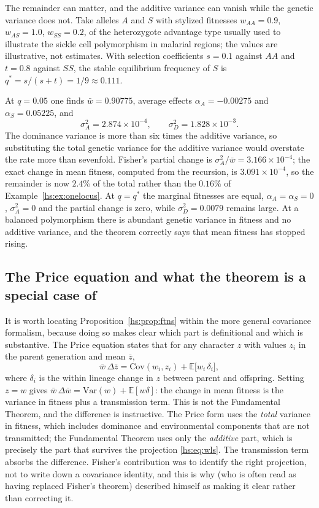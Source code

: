 \begin{example}
\label{hs:ex:overdominance}
The remainder can matter, and the additive variance can vanish while the genetic variance does not. Take alleles $A$ and $S$ with stylized fitnesses $w_{AA} = 0.9$, $w_{AS} = 1.0$, $w_{SS} = 0.2$, of the heterozygote advantage type usually used to illustrate the sickle cell polymorphism in malarial regions; the values are illustrative, not estimates. With selection coefficients $s = 0.1$ against $AA$ and $t = 0.8$ against $SS$, the stable equilibrium frequency of $S$ is $q^* = s/(s+t) = 1/9 \approx 0.111$.

At $q = 0.05$ one finds $\bar w = 0.90775$, average effects $\alpha_A = -0.00275$ and $\alpha_S = 0.05225$, and
\[
\sigma^2_A = 2.874\times10^{-4}, \qquad \sigma^2_D = 1.828\times10^{-3}.
\]
The dominance variance is more than six times the additive variance, so substituting the total genetic variance for the additive variance would overstate the rate more than sevenfold. Fisher's partial change is $\sigma^2_A/\bar w = 3.166\times10^{-4}$; the exact change in mean fitness, computed from the recursion, is $3.091\times10^{-4}$, so the remainder is now $2.4\%$ of the total rather than the $0.16\%$ of Example~\ref{hs:ex:onelocus}. At $q = q^*$ the marginal fitnesses are equal, $\alpha_A = \alpha_S = 0$, $\sigma^2_A = 0$ and the partial change is zero, while $\sigma^2_D = 0.0079$ remains large. At a balanced polymorphism there is abundant genetic variance in fitness and no additive variance, and the theorem correctly says that mean fitness has stopped rising.
\end{example}

\subsection{The Price equation and what the theorem is a special case of}

It is worth locating Proposition~\ref{hs:prop:ftns} within the more general covariance formalism, because doing so makes clear which part is definitional and which is substantive. The Price equation \citep{hs:price1970selection} states that for any character $z$ with values $z_i$ in the parent generation and mean $\bar z$,
\[
\bar w \, \Delta\bar z = \mathrm{Cov}(w_i, z_i) + \mathbb{E}\big[w_i\,\delta_i\big],
\]
where $\delta_i$ is the within lineage change in $z$ between parent and offspring. Setting $z = w$ gives $\bar w\,\Delta\bar w = \mathrm{Var}(w) + \mathbb{E}[w\delta]$: the change in mean fitness is the variance in fitness plus a transmission term. This is not the Fundamental Theorem, and the difference is instructive. The Price form uses the \emph{total} variance in fitness, which includes dominance and environmental components that are not transmitted; the Fundamental Theorem uses only the \emph{additive} part, which is precisely the part that survives the projection \eqref{hs:eq:wls}. The transmission term absorbs the difference. Fisher's contribution was to identify the right projection, not to write down a covariance identity, and this is why \citet{hs:price1972fisher} (who is often read as having replaced Fisher's theorem) described himself as making it clear rather than correcting it.

